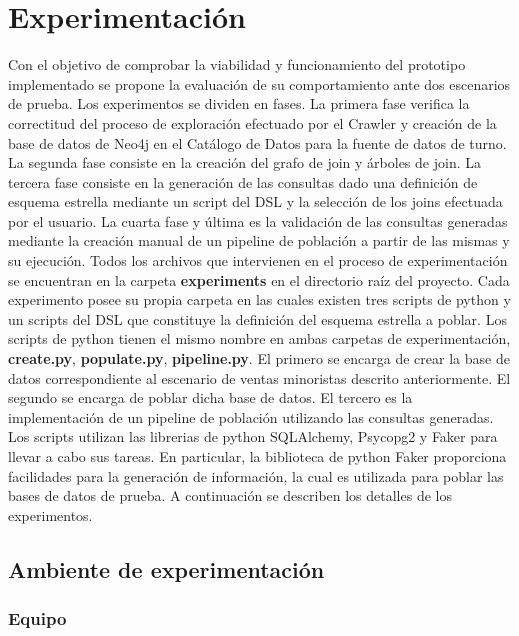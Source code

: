 \section{Experimentaci\'on} \label{section:Experimentation}

Con el objetivo de comprobar la viabilidad y funcionamiento del prototipo implementado se propone la evaluaci\'on 
de su comportamiento ante dos escenarios de prueba. Los experimentos se dividen en fases. La primera fase verifica 
la correctitud del proceso de exploraci\'on efectuado por el Crawler y creaci\'on de la base de datos de Neo4j en el  
Cat\'alogo de Datos para la fuente de datos de turno. La segunda fase consiste en la creaci\'on 
del grafo de join y \'arboles de join. La tercera fase consiste en la generaci\'on de las consultas dado una 
definici\'on de esquema 
estrella mediante un script del DSL y la selecci\'on de los joins efectuada por el usuario. La cuarta fase y \'ultima 
es la validaci\'on de las consultas generadas 
mediante la creaci\'on manual de un pipeline de poblaci\'on a partir de las mismas y su ejecución. Todos los archivos que intervienen 
en el proceso de experimentaci\'on se encuentran en la carpeta \textbf{experiments} en el directorio ra\'iz del proyecto. 
Cada experimento posee su propia carpeta en las cuales existen tres scripts de python y un scripts del DSL que constituye 
la definición del esquema estrella a poblar. Los scripts de python tienen el mismo nombre en ambas carpetas de experimentaci\'on, 
\textbf{create.py}, \textbf{populate.py}, \textbf{pipeline.py}. El primero se encarga de 
crear la base de datos correspondiente al escenario de ventas minoristas descrito anteriormente. El segundo se 
encarga de poblar dicha base de datos. El tercero es la implementaci\'on de un pipeline de poblaci\'on utilizando 
las consultas generadas. Los scripts utilizan las librerias de python SQLAlchemy, Psycopg2 y Faker para llevar a 
cabo sus tareas. En particular, la biblioteca de python Faker proporciona facilidades para la generaci\'on de informaci\'on, 
la cual es utilizada para poblar las bases de datos de prueba. A continuaci\'on se describen 
los detalles de los experimentos.

\subsection{Ambiente de experimentaci\'on}

\subsubsection{Equipo}

